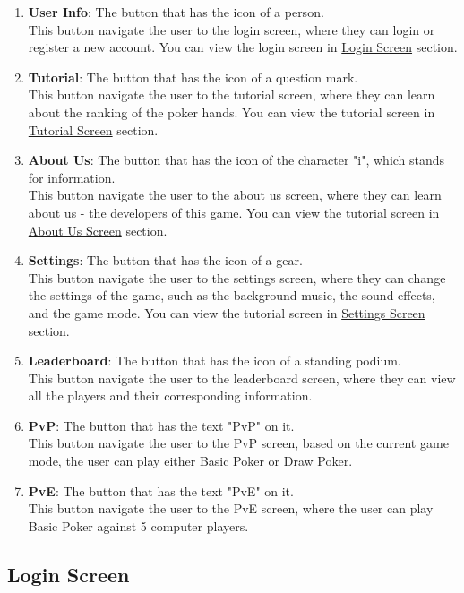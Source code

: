 \begin{enumerate}
    \item \textbf{User Info}: The button that has the icon of a person.
    \\ This button navigate the user to the login screen, where they can login or register a new account. You can view the login screen in \hyperref[subsec:login-screen]{Login Screen} section.
    \item \textbf{Tutorial}: The button that has the icon of a question mark.
    \\ This button navigate the user to the tutorial screen, where they can learn about the ranking of the poker hands. You can view the tutorial screen in \hyperref[subsec:tutorial-screen]{Tutorial Screen} section.
    \item \textbf{About Us}: The button that has the icon of the character "i", which stands for information.
    \\ This button navigate the user to the about us screen, where they can learn about us - the developers of this game. You can view the tutorial screen in \hyperref[subsec:about-us-screen]{About Us Screen} section.
    \item \textbf{Settings}: The button that has the icon of a gear.
    \\ This button navigate the user to the settings screen, where they can change the settings of the game, such as the background music, the sound effects, and the game mode. You can view the tutorial screen in \hyperref[subsec:settings-screen]{Settings Screen} section.
    \item \textbf{Leaderboard}: The button that has the icon of a standing podium.
    \\ This button navigate the user to the leaderboard screen, where they can view all the players and their corresponding information.
    \item \textbf{PvP}: The button that has the text "PvP" on it.
    \\ This button navigate the user to the PvP screen, based on the current game mode, the user can play either Basic Poker or Draw Poker.
    \item \textbf{PvE}: The button that has the text "PvE" on it.
    \\ This button navigate the user to the PvE screen, where the user can play Basic Poker against 5 computer players.
\end{enumerate}

\subsection{Login Screen}
\label{subsec:login-screen}

